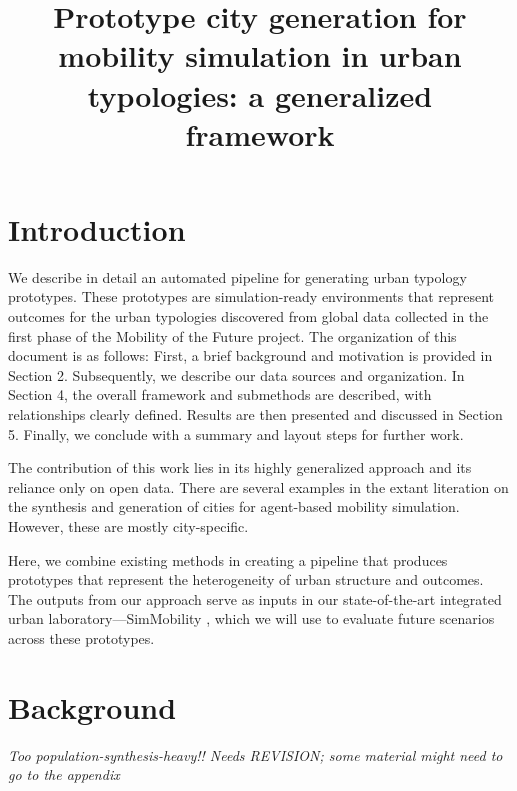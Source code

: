 \documentclass[11pt,twoside]{article}
\numberwithin{equation}{section}
\newcommand{\?}{\stackrel{?}{=}}
\begin{document}
\title{Prototype city generation for mobility simulation in urban typologies: a  generalized framework}
\author{}
\maketitle

\tableofcontents

\newpage

\section{Introduction}
We describe in detail an automated pipeline for generating urban typology prototypes.
These prototypes are simulation-ready environments that represent outcomes for the urban typologies discovered from global data collected in the first phase of the Mobility of the Future project.
The organization of this document is as follows: First, a brief background and motivation is provided in Section 2. Subsequently, we describe our data sources and organization.
In Section 4, the overall framework and submethods are described, with relationships clearly defined.
Results are then presented and discussed in Section 5.
Finally, we conclude with a summary and layout steps for further work.

The contribution of this work lies in its highly generalized approach and its reliance only on open data.
There are several examples in the extant literation on the synthesis and generation of cities for agent-based mobility simulation.
However, these are mostly city-specific.

Here, we combine existing methods in creating a pipeline that produces prototypes that represent the heterogeneity of urban structure and outcomes.
The outputs from our approach serve as inputs in our state-of-the-art integrated urban laboratory---SimMobility \citep{adnan2016simmobility}, which we will use to evaluate future scenarios across these prototypes.

\section{Background}
{\it Too population-synthesis-heavy!! Needs REVISION; some material might need to go to the appendix}\\
\end{document}
